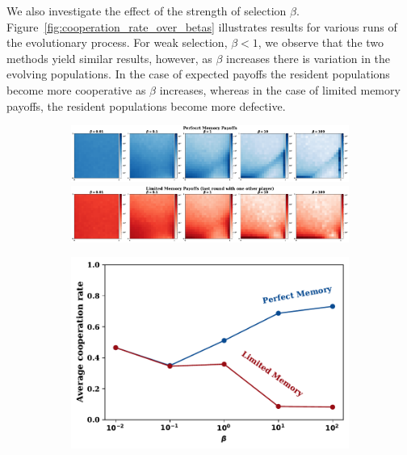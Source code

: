 \documentclass[11pt]{article}
\theoremstyle{plainCl1}
\theoremstyle{plainCl2}
\begin{document}
We also investigate the effect of the strength of selection $\beta$.
Figure~\ref{fig:cooperation_rate_over_betas} illustrates results for various
runs of the evolutionary process. For weak selection, \(\beta < 1\), we observe
that the two methods yield similar results, however, as \(\beta\) increases
there is variation in the evolving populations. In the case of expected payoffs
the resident populations become more cooperative as \(\beta\) increases, whereas
in the case of limited memory payoffs, the resident populations become more
defective.

\begin{figure}[!htbp]
  \centering
  \begin{subfigure}{.65\textwidth}
    \centering
    \includegraphics[width=\textwidth]{static/expected_for_selection_strenght.pdf}
    \includegraphics[width=\textwidth]{static/stochastic_for_selection_strenght.pdf}
  \end{subfigure}%
  \begin{subfigure}{.35\textwidth}
    \vspace{.3cm}
    \includegraphics[width=\textwidth]{static/cooperation_rate_over_betas.pdf}

\end{subfigure}
\end{figure}
\end{document}

